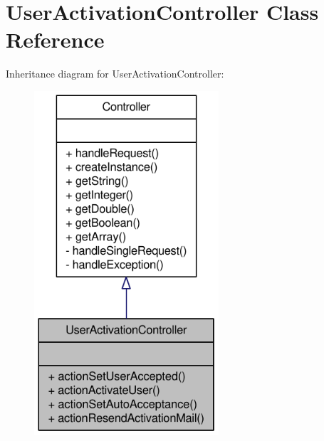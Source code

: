 \hypertarget{classUserActivationController}{
\section{UserActivationController Class Reference}
\label{classUserActivationController}
}


Inheritance diagram for UserActivationController:\nopagebreak
\begin{figure}[H]
\begin{center}
\leavevmode
\includegraphics[width=194pt]{classUserActivationController__inherit__graph}
\end{center}
\end{figure}


